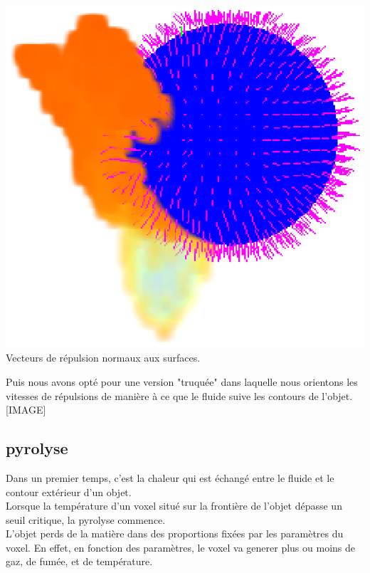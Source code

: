 \documentclass[a4paper,10pt]{article}
\begin{document}
    \begin{center}
	\includegraphics[scale=0.7]{Contour.ps}\\
	Vecteurs de répulsion normaux aux surfaces.
    \end{center}
    
    Puis nous avons opté pour une version "truquée" dans laquelle nous orientons les vitesses de répulsions de manière à ce que le fluide suive les contours de l'objet. \\
    


    [IMAGE]\\






\subsection{pyrolyse}

Dans un premier temps, c'est la chaleur qui est échangé entre le fluide et le contour
extérieur d'un objet.\\
Lorsque la température d'un voxel situé sur la frontière de l'objet dépasse un seuil critique, la pyrolyse commence. \\
L'objet perds de la matière dans des proportions fixées par les paramètres du voxel.
En effet, en fonction des paramètres, le voxel va generer plus ou moins de gaz, de fumée, et de température.
\end{document}

